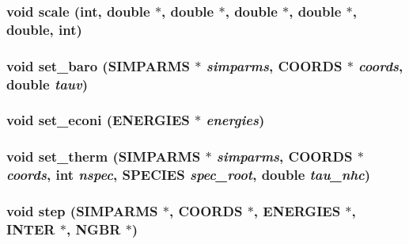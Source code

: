 \subsubsection{\setlength{\rightskip}{0pt plus 5cm}void scale (int, double $\ast$, double $\ast$, double $\ast$, double $\ast$, double, int)}\label{proto__integrate_8h_6859b1cf6263be72d135e741d94a5582}


\subsubsection{\setlength{\rightskip}{0pt plus 5cm}void set\_\-baro ({\bf SIMPARMS} $\ast$ {\em simparms}, {\bf COORDS} $\ast$ {\em coords}, double {\em tauv})}\label{proto__integrate_8h_d72b222d3469248fbdede94c4961c53d}


\subsubsection{\setlength{\rightskip}{0pt plus 5cm}void set\_\-econi ({\bf ENERGIES} $\ast$ {\em energies})}\label{proto__integrate_8h_e24f65d8d6ad70fc67ab4f9ae3d9faf9}


\subsubsection{\setlength{\rightskip}{0pt plus 5cm}void set\_\-therm ({\bf SIMPARMS} $\ast$ {\em simparms}, {\bf COORDS} $\ast$ {\em coords}, int {\em nspec}, {\bf SPECIES} {\em spec\_\-root}, double {\em tau\_\-nhc})}\label{proto__integrate_8h_f4c4bc56999c6628aa2bb363b490d32e}


\subsubsection{\setlength{\rightskip}{0pt plus 5cm}void step ({\bf SIMPARMS} $\ast$, {\bf COORDS} $\ast$, {\bf ENERGIES} $\ast$, {\bf INTER} $\ast$, {\bf NGBR} $\ast$)}\label{proto__integrate_8h_edfad7cb9430981cda59c5fa1600afa3}


